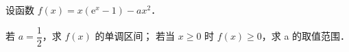\documentclass[a4paper, adobe]{BHCexam}
\begin{document}
\begin{groups}
\begin{questions}[s]
\begin{minipage}{\textwidth}
\begin{solution}{4cm}
\end{solution}
\end{minipage}
\begin{minipage}{\textwidth}
\question[0] 设函数 $f\left(x\right)=x\left({\mathrm {e}}^x-1\right)-ax^2$．
\begin{subquestions}
    \subquestion 若 $a=\dfrac12$，求 $f\left(x\right)$ 的单调区间；
    \subquestion 若当 $x\geqslant0$ 时 $f\left(x\right)\geqslant0$，求 a 的取值范围．
\end{subquestions}
\begin{solution}{8cm}

\end{solution}
\end{minipage}
\end{questions}
\begin{questions}[s]
\end{questions}
\begin{questions}[s]
\end{questions}
\end{groups}
\label{lastpage}
\end{document}
